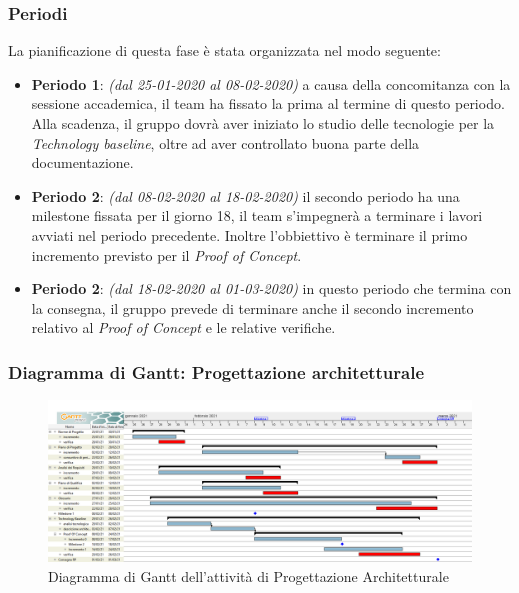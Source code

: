 \subsubsection{Periodi}
La pianificazione di questa fase è stata organizzata nel modo seguente:
\begin{itemize}
\item \textbf{Periodo 1}: \textit{(dal 25-01-2020 al 08-02-2020)} a causa della concomitanza con la sessione accademica, il team ha fissato la prima  al termine di questo periodo. Alla scadenza, il gruppo dovrà aver iniziato lo studio delle tecnologie per la \textit{Technology baseline}, oltre ad aver controllato buona parte della documentazione.

\item \textbf{Periodo 2}: \textit{(dal 08-02-2020 al 18-02-2020)} il secondo periodo ha una milestone fissata per il giorno 18, il team s'impegnerà a terminare i lavori avviati nel periodo precedente. Inoltre l'obbiettivo è terminare il primo incremento previsto per il \textit{Proof of Concept}.

\item \textbf{Periodo 2}: \textit{(dal 18-02-2020 al 01-03-2020)} in questo periodo che termina con la consegna, il gruppo prevede di terminare anche il secondo incremento relativo al \textit{Proof of Concept} e le relative verifiche.
\end{itemize}

\subsubsection{Diagramma di Gantt: Progettazione architetturale}
\begin{figure}[h]
	\centering	
	\includegraphics[scale=0.30]{Images/GanttPianificazioneProgettazioneArchitetturale.PNG}
	\caption{Diagramma di Gantt dell'attività di Progettazione Architetturale}
\end{figure}